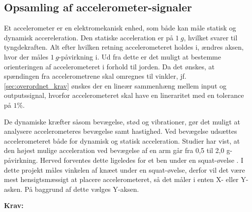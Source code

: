 \subsection{Opsamling af accelerometer-signaler} \label{sec:acc_teori}
Et accelerometer er en elektromekanisk enhed, som både kan måle statisk og dynamisk accereleration. Den statiske acceleration er på $1~g$, hvilket svarer til tyngdekraften. Alt efter hvilken retning accelerometeret holdes i, ændres aksen, hvor der måles $1~g$-påvirkning i. Ud fra dette er det muligt at bestemme orienteringen af accelerometeret i forhold til jorden. Da det ønskes, at spændingen fra accelerometrene skal omregnes til vinkler, jf. \autoref{sec:overordnet_krav} ønskes der en lineær sammenhæng mellem input og outputssignal, hvorfor accelerometeret skal have en lineraritet med en tolerance på $1\%$. 

De dynamiske kræfter såsom bevægelse, stød og vibrationer, gør det muligt at analysere accelerometeres bevægelse samt hastighed. Ved bevægelse udsættes accelerometeret både for dynamisk og statisk acceleration. Studier har vist, at den højest mulige acceleration ved bevægelse af en arm går fra 0,5 til 2,0 g-påvirkning. Herved forventes dette ligeledes for et ben under en squat-øvelse \citep{bernmarka2002}. I dette projekt måles vinkelen af knæet under en squat-øvelse, derfor vil det være mest hensigtsmæssigt at placere accelerometeret, så det måler i enten X- eller Y-asken. På baggrund af dette vælges Y-aksen.

\vspace{3mm}

\textbf{Krav:}
